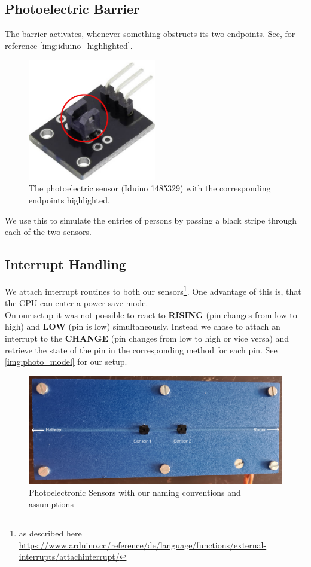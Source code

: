 \documentclass[]{article}
\begin{document}
\begin{sloppypar}
\subsection{Photoelectric Barrier}
The barrier activates, whenever something obstructs its two endpoints. See, for reference \eqref{img:iduino_highlighted}.\\
\begin{figure}[p]
	\centering
	\includegraphics[width=0.5\textwidth, keepaspectratio]{./images/iduino_highlighted.png}
	\caption{The photoelectric sensor (Iduino 1485329) with the corresponding endpoints highlighted.}\label{img:iduino_highlighted}
\end{figure}	
We use this to simulate the entries of persons by passing a black stripe through each of the two sensors.
\subsection{Interrupt Handling}
We attach interrupt routines to both our sensors\footnote{as described here \url{https://www.arduino.cc/reference/de/language/functions/external-interrupts/attachinterrupt/}}. One advantage of this is, that the CPU can enter a power-save mode.\\
On our setup it was not possible to react to \textbf{RISING} (pin changes from low to high) and \textbf{LOW} (pin is low) simultaneously. Instead we chose to attach an interrupt to the \textbf{CHANGE} (pin changes from low to high or vice versa) and retrieve the state of the pin in the corresponding method for each pin. See \eqref{img:photo_model} for our setup.\\
\begin{figure}[p]
	\centering
	\includegraphics[width=\textwidth, keepaspectratio]{./images/photoelectric_model.png}
	\caption{Photoelectronic Sensors with our naming conventions and assumptions}\label{img:photo_model}
\end{figure}

\end{sloppypar}
\end{document}
